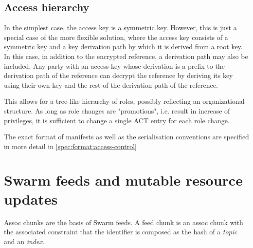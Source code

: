 \subsection{Access hierarchy}

In the simplest case, the access key is a symmetric key. However, this is just a special case of the more flexible solution, where
the access key consists of a symmetric key and a key derivation path by which it is derived from a root key. In this case, in addition to the encrypted reference, a derivation path may also be included. Any party with an access key whose derivation is a prefix to the derivation path of the reference can decrypt the reference by deriving its key using their own key and the rest of the derivation path of the reference.

This allows for a tree-like hierarchy of roles, possibly reflecting an organizational structure. As long as role changes are "promotions", i.e. result in increase of privileges, it is sufficient to change a single ACT entry for each role change.

The exact format of manifests as well as the serialisation conventions are specified in more detail in \ref{spec:format:access-control}






\section{Swarm feeds and mutable resource updates}\label{sec:feeds}

Assoc chunks are the basis of Swarm feeds. A feed chunk is an assoc chunk with the associated constraint that the identifier is composed as the hash of a \emph{topic} and an \emph{index}. 

